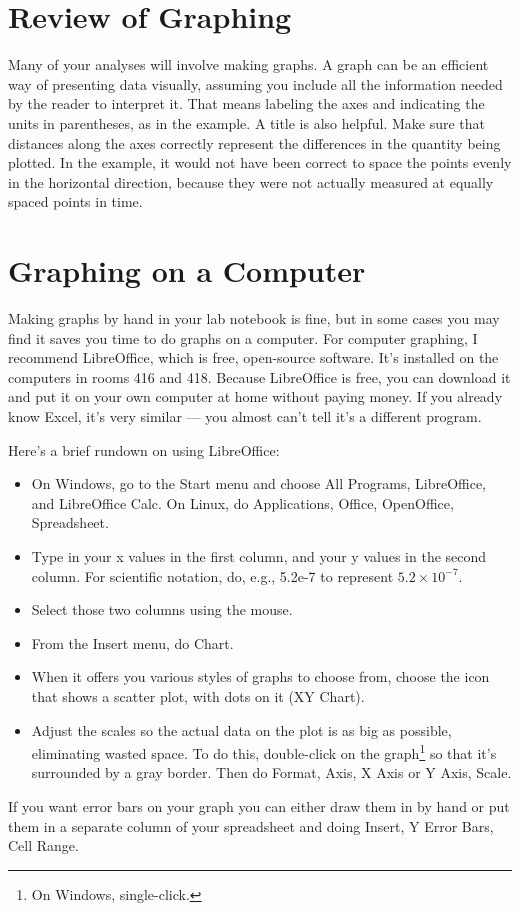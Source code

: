 
\section*{Review of Graphing}
Many of your analyses will involve making graphs. A graph
can be an efficient way of presenting data visually,
assuming you include all the information needed by the
reader to interpret it. That means labeling the axes and
indicating the units in parentheses, as in the example. A
title is also helpful. Make sure that distances along the
axes correctly represent the differences in the quantity
being plotted. In the example, it would not have been
correct to space the points evenly in the horizontal
direction, because they were not actually measured at
equally spaced points in time. 



\section*{Graphing on a Computer}
Making graphs by hand in your lab notebook is fine, but in
some cases you may find it saves you time to do graphs on a
computer. For computer graphing, I recommend LibreOffice, which
is free, open-source software. It's installed on the computers
in rooms 416 and 418. Because LibreOffice is free, you can download
it and put it on your own computer at home without paying money.
If you already know Excel, it's very similar --- you almost can't
tell it's a different program.

Here's a brief rundown on using LibreOffice:
\begin{itemize}
  \item[] On Windows, go to the Start menu and choose All Programs, LibreOffice, and LibreOffice Calc.
          On Linux, do Applications, Office, OpenOffice, Spreadsheet.
  \item[] Type in your x values in the first column, and your
  	y values in the second column. For scientific notation, do, e.g., 5.2e-7
        to represent $5.2\times10^{-7}$.
  \item[] Select those two columns using the mouse.
  \item[] From the Insert menu, do Chart.
  \item[] When it offers you various styles of graphs to choose from, choose
          the icon that shows a scatter plot, with dots on it  (XY Chart).
  \item[] Adjust the scales so the actual data on the plot is as big as possible,
          eliminating wasted space. To do this, double-click on the graph\footnote{On Windows, single-click.} so that it's
          surrounded by a gray border. Then do Format, Axis, X Axis or Y Axis, Scale.
\end{itemize}
If you want error bars on your graph you can either draw them in by hand or put them in a
separate column of your spreadsheet and doing Insert, Y Error Bars, Cell Range.

